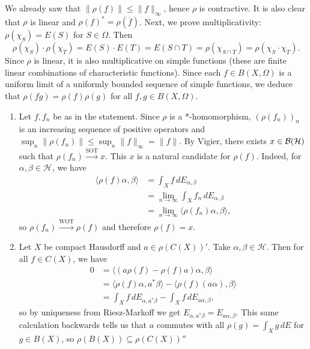 \begin{myproof}
  We already saw that $\|\rho (f)\| \leq \| f\|_{\infty}$, hence $\rho$ is contractive.
  It is also clear that $\rho$ is linear and $\rho (f)^* = \rho (\overline{f})$.
  Next, we prove multiplicativity: $\rho (\chi_S) = E(S)$ for $S \in \Omega$.
  Then $$\rho (\chi_S) \cdot \rho (\chi_T) = E(S) \cdot E(T) = E(S \cap T) = \rho (\chi_{S \cap T}) = \rho (\chi_S \cdot \chi_T).$$
  Since $\rho$ is linear, it is also multiplicative on simple functions (these are finite linear combinations of characteristic functions). 
  Since each $f \in B (X, \Omega)$ is a uniform limit of a uniformly bounded sequence of simple functions,
  we deduce that $\rho (fg) = \rho (f) \rho (g)$ for all $f, g \in B (X, \Omega)$.
  \begin{enumerate}
    \item Let $f, f_n$ be as in the statement. Since $\rho$ is a *-homomorphism,
    $(\rho(f_n))_n$ is an increasing sequence of positive operators and $\sup_n \| \rho (f_n)\| \leq \sup_{n} \|f\|_{\infty} = \|f\|$.
    By Vigier, there exists $x \in \operatorname{\mathcal{B} (\mathcal{H})}$ such that $\rho(f_n) \xrightarrow{\mathrm{SOT}} x$.
    This $x$ is a natural candidate for $\rho(f)$. Indeed, for $\alpha, \beta \in \mathcal{H}$, we have 
    \begin{align*}
      \langle \rho(f) \alpha, \beta\rangle &= \int_X f\, dE_{\alpha, \beta}\\
      &= \lim_{n \to \infty} \int_X f_n\, dE_{\alpha, \beta}\\
      &= \lim_{n \to \infty} \langle \rho(f_n) \alpha, \beta\rangle,
    \end{align*}
    so $\rho(f_n) \xrightarrow{\mathrm{WOT}} \rho(f)$ and therefore $\rho(f) = x$.
    \item Let $X$ be compact Hausdorff and $a \in \rho(C(X))'$. Take $\alpha, \beta \in \mathcal{H}$.
    Then for all $f \in C(X)$, we have 
    \begin{align*}
      0 &= \langle (a \rho(f) - \rho(f) a)\alpha, \beta\rangle\\
      &= \langle \rho(f) \alpha, a^*\beta\rangle - \langle \rho(f) (a\alpha), \beta\rangle\\
      &= \int_X f\, dE_{\alpha, a^* \beta} - \int_X f\, dE_{a\alpha, \beta},
    \end{align*}
    so by uniqueness from Riesz-Markoff we get $E_{\alpha, a^* \beta} = E_{a\alpha,\beta}$.
    This same calculation backwards tells us that $a$ commutes with all $\rho(g) = \int_X g\, dE$ for $g \in B(X)$, so 
    $\rho(B(X)) \subseteq \rho(C(X))''$ \qedhere
  \end{enumerate}
\end{myproof}

